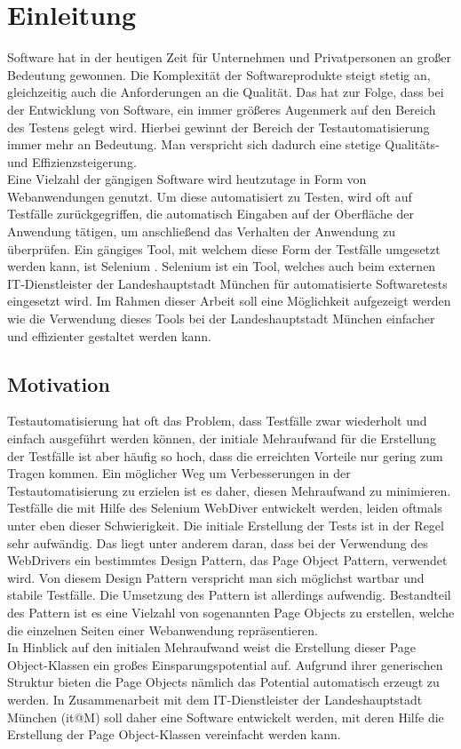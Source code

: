 \chapter{Einleitung}
\label{sec:einleitung}
Software hat in der heutigen Zeit für Unternehmen und Privatpersonen an großer Bedeutung gewonnen.
Die Komplexität der Softwareprodukte steigt stetig an, gleichzeitig auch die Anforderungen an die Qualität.
Das hat zur Folge, dass bei der Entwicklung von Software, ein immer größeres Augenmerk auf den Bereich des Testens gelegt wird.
Hierbei gewinnt der Bereich der Testautomatisierung immer mehr an Bedeutung.
Man verspricht sich dadurch eine stetige Qualitäts- und Effizienzsteigerung.\\
Eine Vielzahl der gängigen Software wird heutzutage in Form von Webanwendungen genutzt.
Um diese automatisiert zu Testen, wird oft auf Testfälle zurückgegriffen, die automatisch Eingaben auf der Oberfläche der Anwendung tätigen, um anschließend das Verhalten der Anwendung zu überprüfen.
Ein gängiges Tool, mit welchem diese Form der Testfälle umgesetzt werden kann, ist Selenium \cite{selenium_selenium_2015}. Selenium ist ein Tool, welches auch beim externen IT-Dienstleister der Landeshauptstadt München für automatisierte Softwaretests eingesetzt wird. Im Rahmen dieser Arbeit soll eine Möglichkeit aufgezeigt werden wie die Verwendung dieses Tools bei der Landeshauptstadt München einfacher und effizienter gestaltet werden kann.
\\

\section{Motivation}
\label{sec:motivation}
Testautomatisierung hat oft das Problem, dass Testfälle zwar wiederholt und einfach ausgeführt werden können, der initiale Mehraufwand für die Erstellung der Testfälle ist aber häufig so hoch, dass die erreichten Vorteile nur gering zum Tragen kommen. Ein möglicher Weg um Verbesserungen in der Testautomatisierung zu erzielen ist es daher, diesen Mehraufwand zu minimieren.\\
Testfälle die mit Hilfe des Selenium WebDiver entwickelt werden, leiden oftmals unter eben dieser Schwierigkeit. Die initiale Erstellung der Tests ist in der Regel sehr aufwändig.
Das liegt unter anderem daran, dass bei der Verwendung des WebDrivers ein bestimmtes Design Pattern, das Page Object Pattern, verwendet wird. Von diesem Design Pattern verspricht man sich möglichst wartbar und stabile Testfälle. Die Umsetzung des Pattern ist allerdings aufwendig.
Bestandteil des Pattern ist es eine Vielzahl von sogenannten Page Objects zu erstellen, welche die einzelnen Seiten einer Webanwendung repräsentieren.\\
In Hinblick auf den initialen Mehraufwand weist die Erstellung dieser Page Object-Klassen ein großes Einsparungspotential auf. Aufgrund ihrer generischen Struktur bieten die Page Objects nämlich das Potential automatisch erzeugt zu werden.
In Zusammenarbeit mit dem IT-Dienstleister der Landeshauptstadt München (it@M) soll daher eine Software entwickelt werden, mit deren Hilfe die Erstellung der Page Object-Klassen vereinfacht werden kann.

